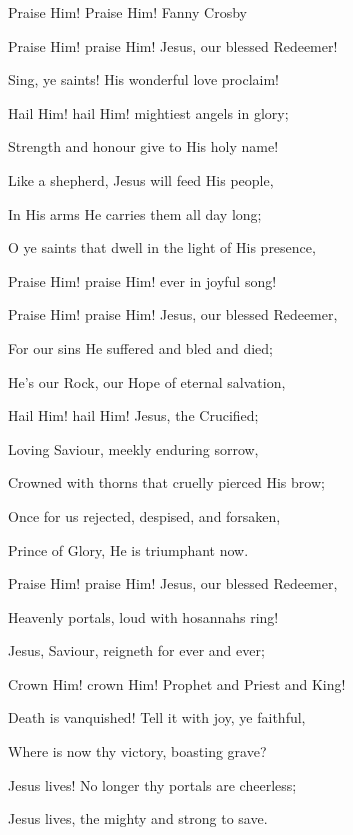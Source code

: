 \documentclass[12pt]{book}
\begin{document}
\begin{song}{Praise Him! Praise Him!}{}
  {\SBPubDom}
  {Fanny Crosby}
  {}
  {}

  \begin{SBVerse}
    Praise Him! praise Him! Jesus, our blessed Redeemer!

    Sing, ye saints! His wonderful love proclaim!

    Hail Him! hail Him! mightiest angels in glory;

    Strength and honour give to His holy name!

    Like a shepherd, Jesus will feed His people,

    In His arms He carries them all day long;

    O ye saints that dwell in the light of His presence,

    Praise Him! praise Him! ever in joyful song!
  \end{SBVerse}

  \begin{SBVerse}
    Praise Him! praise Him! Jesus, our blessed Redeemer,

    For our sins He suffered and bled and died;

    He's our Rock, our Hope of eternal salvation,

    Hail Him! hail Him! Jesus, the Crucified;

    Loving Saviour, meekly enduring sorrow,

    Crowned with thorns that cruelly pierced His brow;

    Once for us rejected, despised, and forsaken,

    Prince of Glory, He is triumphant now.
  \end{SBVerse}

  \begin{SBVerse}
    Praise Him! praise Him! Jesus, our blessed Redeemer,

    Heavenly portals, loud with hosannahs ring!

    Jesus, Saviour, reigneth for ever and ever;

    Crown Him! crown Him! Prophet and Priest and King!

    Death is vanquished! Tell it with joy, ye faithful,

    Where is now thy victory, boasting grave?

    Jesus lives! No longer thy portals are cheerless;

    Jesus lives, the mighty and strong to save.
  \end{SBVerse}
\end{song}
\end{document}
